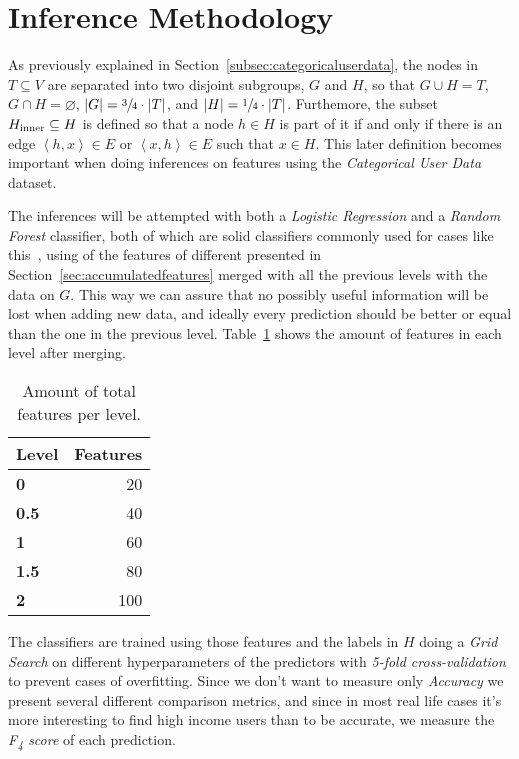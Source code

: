 \section{Inference Methodology}

As previously explained in Section~\ref{subsec:categoricaluserdata}, the nodes in $T \subseteq V$ are separated into two disjoint subgroups, $G$ and $H$, so that $G \cup H = T$, $G \cap H = \varnothing$, $\left| G \right| = \sfrac{3}{4} \cdot \left| T \right|$, and $\left| H \right| = \sfrac{1}{4} \cdot \left| T \right|$. Furthemore, the subset $H_{\operatorname{inner}} \subseteq H$ is defined so that a node $h \in H$ is part of it if and only if there is an edge $\left< h, x \right> \in E$ or $\left< x, h \right> \in E$ such that $x \in H$\footnotemark{}. This later definition becomes important when doing inferences on features using the \emph{Categorical User Data} dataset.


The inferences will be attempted with both a \emph{Logistic Regression} and a \emph{Random Forest} classifier, both of which are solid classifiers commonly used for cases like this~\cite{binaryevaluation}, using of the features of different presented in Section~\ref{sec:accumulatedfeatures} merged with all the previous levels with the data on $G$. This way we can assure that no possibly useful information will be lost when adding new data, and ideally every prediction should be better or equal than the one in the previous level. Table~\ref{tab:features} shows the amount of features in each level after merging.

\begin{table}[h]
\centering
\begin{tabular}{>{\bfseries}l r}
\toprule
Level & Features \\
\midrule
0 & \num{20} \\
0.5 & \num{40} \\
1 & \num{60} \\
1.5 & \num{80} \\
2 & \num{100} \\
\bottomrule
\end{tabular}
\caption{Amount of total features per level. \\ }
\label{tab:features}
\end{table}

The classifiers are trained using those features and the labels in $H$ doing a \emph{Grid Search} on different hyperparameters of the predictors with \emph{5-fold cross-validation} to prevent cases of overfitting. Since we don't want to measure only \emph{Accuracy} we present several different comparison metrics, and since in most real life cases it's more interesting to find high income users than to be accurate\footnotemark{}, we measure the \emph{F\textsubscript{4} score} of each prediction.

